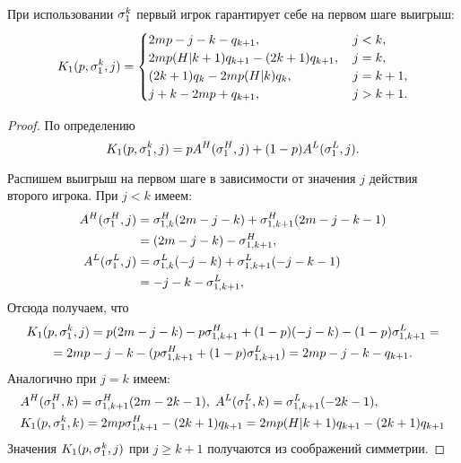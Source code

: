 \begin{utver}
\label{utver:lower_bound:general_step}
При использовании $ \sigma^k_1 $ первый игрок гарантирует себе на первом шаге выигрыш:
\begin{equation}
\label{eq:lower_bound:general_step}
K_1(p, \sigma^k_1, j) = \begin{cases}
    2mp - j - k - q_{k+1}, &\, j < k,\\
    2mp(H|k+1)q_{k+1} - (2k+1)q_{k+1}, &\, j = k,\\
    (2k + 1)q_k - 2mp(H|k)q_k, &\, j = k+1,\\
    j + k - 2mp + q_{k+1}, &\, j > k + 1.
\end{cases}
\end{equation}
\end{utver}
\begin{proof}
По определению
\begin{equation}
\label{eq:payoff:stage}
    K_1(p, \sigma^k_1, j) = pA^H(\sigma^H_1, j) + (1-p)A^L(\sigma^L_1, j).
\end{equation}

Распишем выигрыш на первом шаге в зависимости от значения $ j $ действия второго игрока.
При $ j < k $ имеем:
\begin{align*}
  A^H(\sigma^H_1, j)
  &= \sigma^H_{1,k} (2m - j - k) + \sigma^H_{1,k+1} (2m - j - k - 1) \\
  &= (2m - j - k) - \sigma^H_{1,k+1},\\
  A^L(\sigma^L_1, j)
  &= \sigma^L_{1,k} (-j - k) + \sigma^L_{1,k+1} (-j - k - 1) \\
  &= - j - k - \sigma^L_{1,k+1}, \\
\end{align*}
Отсюда получаем, что
\begin{multline*}
  K_1(p, \sigma^k_1, j) 
  = p (2m - j - k) - p\sigma^H_{1,k+1} + 
      (1-p)(-j - k) - (1-p)\sigma^L_{1,k+1} = \\
  = 2mp - j - k - (p\sigma^H_{1,k+1} + (1-p)\sigma^L_{1,k+1}) = 2mp - j - k - q_{k+1}.
\end{multline*}
Аналогично при $ j = k $ имеем:
\begin{align*}
  &A^H(\sigma^H_1, k) = \sigma^H_{1,k+1} (2m - 2k - 1), \;
  A^L(\sigma^L_1, k) = \sigma^L_{1,k+1} (-2k - 1), \\
  &K_1(p, \sigma^k_1, k) = 2mp\sigma^H_{1,k+1} - (2k+1)q_{k+1} = 2mp(H|k+1)q_{k+1} - (2k+1)q_{k+1}
\end{align*}
Значения $ K_1(p, \sigma^k_1, j) $ при $ j \geq k + 1 $ получаются из соображений симметрии.
\end{proof}

